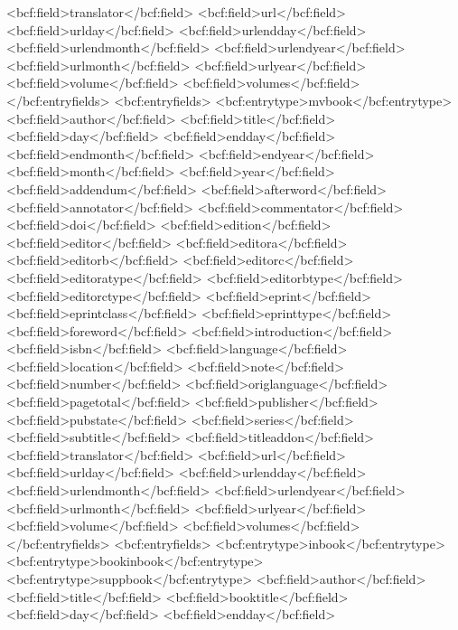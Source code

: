       <bcf:field>translator</bcf:field>
      <bcf:field>url</bcf:field>
      <bcf:field>urlday</bcf:field>
      <bcf:field>urlendday</bcf:field>
      <bcf:field>urlendmonth</bcf:field>
      <bcf:field>urlendyear</bcf:field>
      <bcf:field>urlmonth</bcf:field>
      <bcf:field>urlyear</bcf:field>
      <bcf:field>volume</bcf:field>
      <bcf:field>volumes</bcf:field>
    </bcf:entryfields>
    <bcf:entryfields>
      <bcf:entrytype>mvbook</bcf:entrytype>
      <bcf:field>author</bcf:field>
      <bcf:field>title</bcf:field>
      <bcf:field>day</bcf:field>
      <bcf:field>endday</bcf:field>
      <bcf:field>endmonth</bcf:field>
      <bcf:field>endyear</bcf:field>
      <bcf:field>month</bcf:field>
      <bcf:field>year</bcf:field>
      <bcf:field>addendum</bcf:field>
      <bcf:field>afterword</bcf:field>
      <bcf:field>annotator</bcf:field>
      <bcf:field>commentator</bcf:field>
      <bcf:field>doi</bcf:field>
      <bcf:field>edition</bcf:field>
      <bcf:field>editor</bcf:field>
      <bcf:field>editora</bcf:field>
      <bcf:field>editorb</bcf:field>
      <bcf:field>editorc</bcf:field>
      <bcf:field>editoratype</bcf:field>
      <bcf:field>editorbtype</bcf:field>
      <bcf:field>editorctype</bcf:field>
      <bcf:field>eprint</bcf:field>
      <bcf:field>eprintclass</bcf:field>
      <bcf:field>eprinttype</bcf:field>
      <bcf:field>foreword</bcf:field>
      <bcf:field>introduction</bcf:field>
      <bcf:field>isbn</bcf:field>
      <bcf:field>language</bcf:field>
      <bcf:field>location</bcf:field>
      <bcf:field>note</bcf:field>
      <bcf:field>number</bcf:field>
      <bcf:field>origlanguage</bcf:field>
      <bcf:field>pagetotal</bcf:field>
      <bcf:field>publisher</bcf:field>
      <bcf:field>pubstate</bcf:field>
      <bcf:field>series</bcf:field>
      <bcf:field>subtitle</bcf:field>
      <bcf:field>titleaddon</bcf:field>
      <bcf:field>translator</bcf:field>
      <bcf:field>url</bcf:field>
      <bcf:field>urlday</bcf:field>
      <bcf:field>urlendday</bcf:field>
      <bcf:field>urlendmonth</bcf:field>
      <bcf:field>urlendyear</bcf:field>
      <bcf:field>urlmonth</bcf:field>
      <bcf:field>urlyear</bcf:field>
      <bcf:field>volume</bcf:field>
      <bcf:field>volumes</bcf:field>
    </bcf:entryfields>
    <bcf:entryfields>
      <bcf:entrytype>inbook</bcf:entrytype>
      <bcf:entrytype>bookinbook</bcf:entrytype>
      <bcf:entrytype>suppbook</bcf:entrytype>
      <bcf:field>author</bcf:field>
      <bcf:field>title</bcf:field>
      <bcf:field>booktitle</bcf:field>
      <bcf:field>day</bcf:field>
      <bcf:field>endday</bcf:field>
